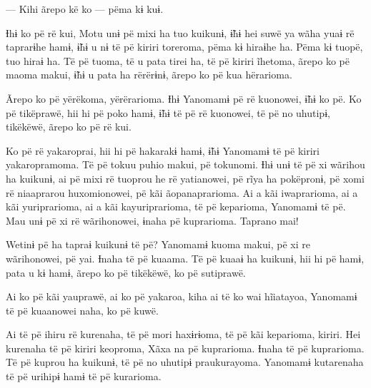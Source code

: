  

 

--- Kihi ãrepo kë ko --- pëma kɨ kuɨ. 

Ɨhɨ ko pë rë kui, Motu unɨ pë mixi ha tuo kuikunɨ, ɨ̃hɨ hei suwë ya wãha
yuaɨ rë taprarɨhe hamɨ, ɨ̃hɨ u nɨ të pë kiriri toreroma, pëma kɨ hiraɨhe
ha. Pëma kɨ tuopë, tuo hiraɨ ha. Të pë tuoma, të u pata tirei ha, të pë
kiriri ĩhetoma, ãrepo ko pë maoma makui, ɨ̃hɨ u pata ha rërërɨnɨ, ãrepo
ko pë kua hërarioma. 

Ãrepo ko pë yërëkoma, yërërarioma. Ɨhɨ Yanomamɨ pë rë kuonowei, ɨ̃hɨ ko
pë. Ko pë tikëprawë, hii hi pë poko hamɨ, ɨ̃hɨ të pë rë kuonowei, të pë
no uhutipɨ, tikëkëwë, ãrepo ko pë rë kui. 

Ko pë rë yakaroprai, hii hi pë hakarakɨ hamɨ, ɨ̃hɨ Yanomamɨ të pë kiriri
yakaropramoma. Të pë tokuu puhio makui, pë tokunomi. Ɨhɨ unɨ të pë xi
wãrihou ha kuikunɨ, ai pë mixi rë tuoprou he rë yatianowei, pë rĩya ha
pokëpronɨ, pë xomi rë niaaprarou huxomionowei, pë kãi ãopanaprarioma. Ai
a kãi iwaprarioma, ai a kãi yuriprarioma, ai a kãi kayuriprarioma, të pë
keparioma, Yanomamɨ të pë. Mau unɨ pë xi rë wãrihonowei, ɨnaha pë
kuprarioma. Taprano mai! 

Wetinɨ pë ha tapraɨ kuikunɨ të pë? Yanomamɨ kuoma makui, pë xi re
wãrihonowei, pë yai. Ɨnaha të pë kuaama. Të pë kuaaɨ ha kuikunɨ, hii hi
pë hamɨ, pata u kɨ hamɨ, ãrepo ko pë tikëkëwë, ko pë sutiprawë. 

Ai ko pë kãi yauprawë, ai ko pë yakaroa, kiha ai të ko wai hĩiatayoa,
Yanomamɨ të pë kuaanowei naha, ko pë kuwë. 

Ai të pë ihiru rë kurenaha, të pë mori haxɨrɨoma, të pë kãi keparioma,
kiriri. Hei kurenaha të pë kiriri keoproma, Xãxa na pë kuprarioma. Ɨnaha
të pë kuprarioma. Të pë kuprou ha kuikunɨ, të pë no uhutipɨ
praukurayoma. Yanomamɨ kutarenaha të pë urihipɨ hamɨ të pë kurarioma.